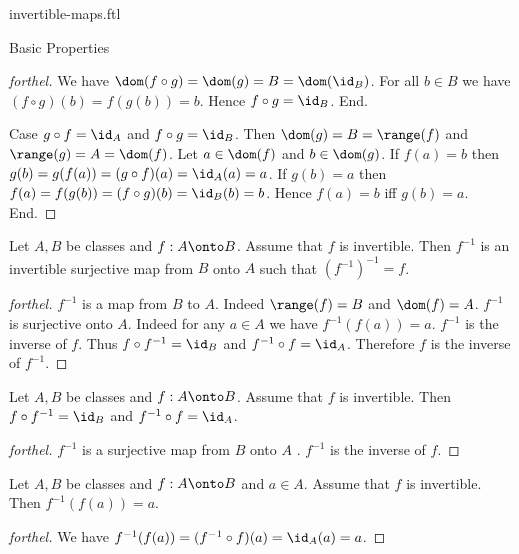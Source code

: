 \documentclass{naproche-library}
\begin{document}
\begin{smodule}[title=Invertible Maps]{invertible-maps.ftl}
\begin{sfragment}{Basic Properties}
\begin{proof}[forthel]
      We have
      $\dom(f \circ g)
        = \dom(g)
        = B
        = \dom(\id_{B})$.
      For all $b \in B$ we have
      $(f \circ g)(b)
        = f(g(b))
        = b$.
      Hence $f \circ g = \id_{B}$.
    End.

    Case $g \circ f = \id_{A}$ and $f \circ g = \id_{B}$.
      Then $\dom(g)
        = B
        = \range(f)$
      and $\range(g)
        = A
        = \dom(f)$.
      Let $a \in \dom(f)$ and $b \in \dom(g)$.
      If $f(a) = b$ then
      $g(b)
        = g(f(a))
        = (g \circ f)(a)
        = \id_{A}(a)
        = a$.
      If $g(b) = a$ then
      $f(a)
        = f(g(b))
        = (f \circ g)(b)
        = \id_{B}(b)
        = b$.
      Hence $f(a) = b$ iff $g(b) = a$.
    End.
  \end{proof}

  \begin{proposition}[forthel,id=FOUNDATIONS_09_8414736098000896]
    Let $A, B$ be classes and $f : A \onto B$.
    Assume that $f$ is invertible.
    Then $f^{-1}$ is an invertible surjective map from $B$ onto $A$ such that $(f^{-1})^{-1} = f$.
  \end{proposition}
  \begin{proof}[forthel]
    $f^{-1}$ is a map from $B$ to $A$.
    Indeed $\range(f) = B$ and $\dom(f) = A$.
    $f^{-1}$ is surjective onto $A$.
    Indeed for any $a \in A$ we have $f^{-1}(f(a)) = a$.
    $f^{-1}$ is the inverse of $f$.
    Thus $f \circ f^{-1} = \id_{B}$ and $f^{-1} \circ f = \id_{A}$.
    Therefore $f$ is the inverse of $f^{-1}$.
  \end{proof}

  \begin{proposition}[forthel,id=FOUNDATIONS_09_4577560740495360]
    Let $A, B$ be classes and $f : A \onto B$.
    Assume that $f$ is invertible.
    Then $f \circ f^{-1} = \id_{B}$ and $f^{-1} \circ f = \id_{A}$.
  \end{proposition}
  \begin{proof}[forthel]
    $f^{-1}$ is a surjective map from $B$ onto $A$ .
    $f^{-1}$ is the inverse of $f$.
  \end{proof}

  \begin{proposition}[forthel,id=FOUNDATIONS_09_4606651604664320]
    Let $A, B$ be classes and $f : A \onto B$ and $a \in A$.
    Assume that $f$ is invertible.
    Then $f^{-1}(f(a)) = a$.
  \end{proposition}
  \begin{proof}[forthel]
    We have $f^{-1}(f(a)) = (f^{-1} \circ f)(a) = \id_{A}(a) = a$.
  \end{proof}


\end{sfragment}
\end{smodule}
\end{document}
